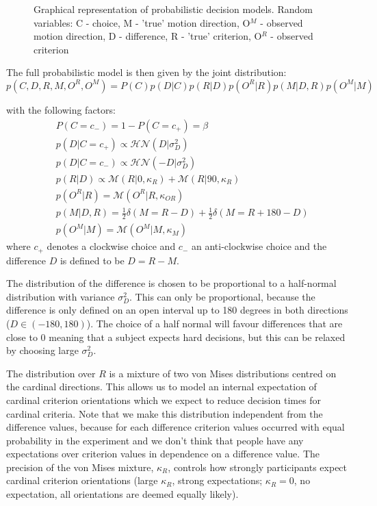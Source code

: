 \documentclass[10pt,a4paper]{article}
\begin{document}
\begin{figure}
    \centering
    \def\svgwidth{.5\columnwidth}
    
    \caption{Graphical representation of probabilistic decision models. Random variables: C - choice, M - 'true' motion direction, O$^M$ - observed motion direction, D - difference, R - 'true' criterion, O$^R$ - observed criterion}
    \label{fig:graphic_models}
\end{figure}

The full probabilistic model is then given by the joint distribution:
\begin{equation}\label{eq:joint_diff}
p(C, D, R, M, O^R, O^M) = P(C)p(D | C)p(R | D)p(O^R | R)p(M | D, R)p(O^M | M)
\end{equation}

with the following factors:
\begin{align}
&P(C = c_-) = 1 - P(C = c_+) = \beta\\
&p(D | C=c_+) \propto \mathcal{HN}(D | \sigma_D^2)\\
&p(D | C=c_-) \propto \mathcal{HN}(-D | \sigma_D^2)\\
&p(R | D) \propto \mathcal{M}(R | 0, \kappa_{R}) + \mathcal{M}(R | 90, \kappa_{R})\\
&p(O^R | R) = \mathcal{M}(O^R | R, \kappa_{OR})\\
&p(M | D, R) = \frac{1}{2}\delta(M = R - D) + \frac{1}{2}\delta(M = R + 180 - D)\\
&p(O^M | M) = \mathcal{M}(O^M | M, \kappa_{M})
\end{align}
where $c_+$ denotes a clockwise choice and $c_-$ an anti-clockwise choice and the difference $D$ is defined to be $D = R - M$. 

The distribution of the difference is chosen to be proportional to a half-normal distribution with variance $\sigma_D^2$. This can only be proportional, because the difference is only defined on an open interval up to 180 degrees in both directions ($D \in (-180, 180)$). The choice of a half normal will favour differences that are close to 0 meaning that a subject expects hard decisions, but this can be relaxed by choosing large $\sigma_D^2$. 

The distribution over $R$ is a mixture of two von Mises distributions centred on the cardinal directions. This allows us to model an internal expectation of cardinal criterion orientations which we expect to reduce decision times for cardinal criteria. Note that we make this distribution independent from the difference values, because for each difference criterion values occurred with equal probability in the experiment and we don't think that people have any expectations over criterion values in dependence on a difference value. The precision of the von Mises mixture, $\kappa_R$, controls how strongly participants expect cardinal criterion orientations (large $\kappa_R$, strong expectations; $\kappa_R=0$, no expectation, all orientations are deemed equally likely).
\end{document}
